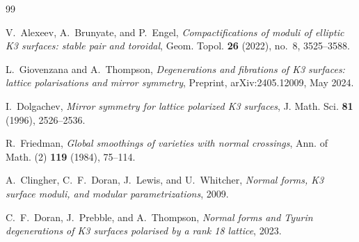 \documentclass[11pt]{amsart}
\theoremstyle{definition}
\begin{document}
\begin{thebibliography}{99}

V.~Alexeev, A.~Brunyate, and P.~Engel,
\emph{Compactifications of moduli of elliptic {K3} surfaces: stable pair and toroidal},
Geom. Topol. \textbf{26} (2022), no.~8, 3525--3588.

L.~Giovenzana and A.~Thompson,
\emph{Degenerations and fibrations of {K3} surfaces: lattice polarisations and mirror symmetry},
Preprint, arXiv:2405.12009, May 2024.

I.~Dolgachev,
\emph{Mirror symmetry for lattice polarized {K3} surfaces},
J. Math. Sci. \textbf{81} (1996), 2526--2536.

R.~Friedman,
\emph{Global smoothings of varieties with normal crossings},
Ann. of Math. (2) \textbf{119} (1984), 75--114.

A.~Clingher, C.~F.~Doran, J.~Lewis, and U.~Whitcher,
\emph{Normal forms, {K3} surface moduli, and modular parametrizations},
2009.

C.~F.~Doran, J.~Prebble, and A.~Thompson,
\emph{Normal forms and {Tyurin} degenerations of {K3} surfaces polarised by a rank 18 lattice},
2023.

\end{thebibliography}
\end{document}
